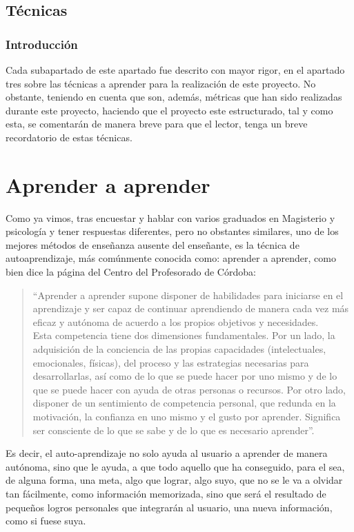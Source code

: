 \subsection{Técnicas}
\subsubsection{Introducción}
Cada subapartado de este apartado fue descrito con mayor rigor, en el apartado tres sobre las técnicas a aprender para la realización de este proyecto. No obstante, teniendo en cuenta que son, además, métricas que han sido realizadas durante este proyecto, haciendo que el proyecto este estructurado, tal y como esta, se comentarán de manera breve para que el lector, tenga un breve recordatorio de estas técnicas.
\section{Aprender a aprender}
Como ya vimos, tras encuestar y hablar con varios graduados en Magisterio y psicología y tener respuestas diferentes, pero no obstantes similares, uno de los mejores métodos de enseñanza ausente del enseñante, es la técnica de autoaprendizaje, más comúnmente conocida como: aprender a aprender, como bien dice la página del Centro del Profesorado de Córdoba:
\begin{quote}
“Aprender a aprender supone disponer de habilidades para iniciarse en el aprendizaje y ser capaz de continuar aprendiendo de manera cada vez más eficaz y autónoma de acuerdo a los propios objetivos y necesidades.\\

Esta competencia tiene dos dimensiones fundamentales. Por un lado, la adquisición de la conciencia de las propias capacidades (intelectuales, emocionales, físicas), del proceso y las estrategias necesarias para desarrollarlas, así como de lo que se puede hacer por uno mismo y de lo que se puede hacer con ayuda de otras personas o recursos. Por otro lado, disponer de un sentimiento de competencia personal, que redunda en la motivación, la confianza en uno mismo y el gusto por aprender. Significa ser consciente de lo que se sabe y de lo que es necesario aprender”. \cite{aprederAAprender}


\end{quote}

Es decir, el auto-aprendizaje no solo ayuda al usuario a aprender de manera autónoma, sino que le ayuda, a que todo aquello que ha conseguido, para el sea, de alguna forma, una meta, algo que lograr, algo suyo, que no se le va a olvidar tan fácilmente, como información memorizada, sino que será el resultado de pequeños logros personales que integrarán al usuario, una nueva información, como si fuese suya.
